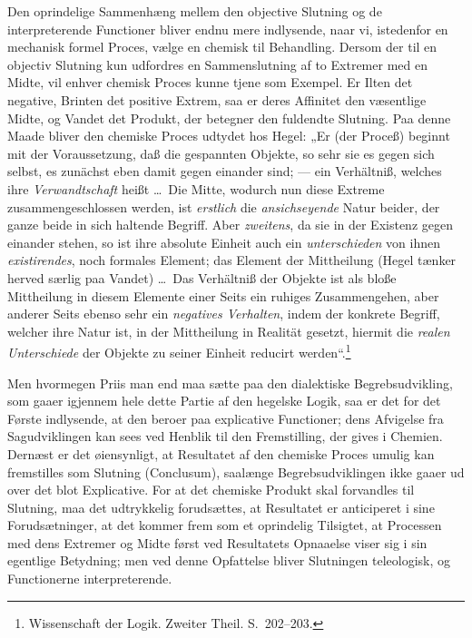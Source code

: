 \documentclass[12pt]{book}
\newcommand{\opage}[1]{\marginnote{\footnotesize\textit{[#1]}}}
\begin{document}
Den oprindelige Sammenhæng mellem den objective Slutning og de interpreterende Functioner bliver endnu mere indlysende, naar vi, istedenfor en mechanisk formel Proces, vælge en chemisk til Behandling. Dersom der til en objectiv Slutning kun udfordres en Sammenslutning af to Extremer med en Midte, vil enhver chemisk Proces kunne tjene som Exempel. Er Ilten det negative, Brinten det positive Extrem,
\opage{388}saa er deres Affinitet den væsentlige Midte, og Vandet det Produkt, der betegner den fuldendte Slutning. Paa denne Maade bliver den chemiske Proces udtydet hos Hegel: „Er (der Proceß) beginnt mit der Voraussetzung, daß die gespannten Objekte, so sehr sie es gegen sich selbst, es zunächst eben damit gegen einander sind; --- ein Verhältniß, welches ihre \emph{Verwandtschaft} heißt \ldots\ Die Mitte, wodurch nun diese Extreme zusammengeschlossen werden, ist \emph{erstlich} die \emph{ansichseyende} Natur beider, der ganze beide in sich haltende Begriff. Aber \emph{zweitens}, da sie in der Existenz gegen einander stehen, so ist ihre absolute Einheit auch ein \emph{unterschieden} von ihnen \emph{existirendes}, noch formales Element; das Element der Mittheilung (Hegel tænker herved særlig paa Vandet) \ldots\ Das Verhältniß der Objekte ist als bloße Mittheilung in diesem Elemente einer Seits ein ruhiges Zusammengehen, aber anderer Seits ebenso sehr ein \emph{negatives Verhalten}, indem der konkrete Begriff, welcher ihre Natur ist, in der Mittheilung in Realität gesetzt, hiermit die \emph{realen Unterschiede} der Objekte zu seiner Einheit reducirt werden“.\footnote{Wissenschaft der Logik. Zweiter Theil. S.~202--203.}%

Men hvormegen Priis man end maa sætte paa den dialektiske Begrebsudvikling, som gaaer igjennem hele dette Partie af den hegelske Logik, saa er det for det Første indlysende, at den beroer paa explicative Functioner; dens Afvigelse fra Sagudviklingen kan sees ved Henblik til den Fremstilling, der gives i Chemien. Dernæst er det øiensynligt, at Resultatet af den chemiske Proces umulig kan fremstilles som Slutning (Conclusum), saalænge Begrebsudviklingen ikke gaaer ud over det blot Explicative. For at det chemiske Produkt skal forvandles til Slutning, maa det udtrykkelig forudsættes, at Resultatet er anticiperet i sine Forudsætninger, at det kommer frem som et oprindelig Tilsigtet, at Processen med dens Extremer og Midte først ved Resultatets Opnaaelse
\opage{389}viser sig i sin egentlige Betydning; men ved denne Opfattelse bliver Slutningen teleologisk, og Functionerne interpreterende.
\end{document}
